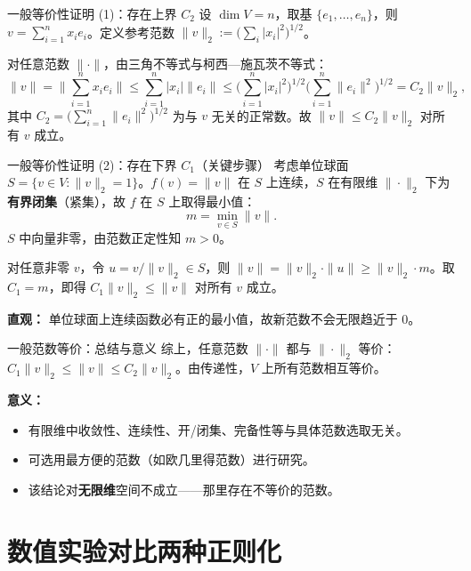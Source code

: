 \documentclass[aspectratio=169]{beamer}
\begin{document}
\begin{frame}{一般等价性证明 (1)：存在上界 $C_2$}
    设 $\dim V = n$，取基 $\{e_1,\dots,e_n\}$，则 $v = \sum_{i=1}^n x_i e_i$。定义参考范数 $\|v\|_2 := \big(\sum_i |x_i|^2\big)^{1/2}$。

    对任意范数 $\|\cdot\|$，由三角不等式与柯西—施瓦茨不等式：
    \[
    \|v\| = \Big\|\sum_{i=1}^n x_i e_i\Big\| \le \sum_{i=1}^n |x_i| \|e_i\|
    \le \Big(\sum_{i=1}^n |x_i|^2\Big)^{\!1/2} \Big(\sum_{i=1}^n \|e_i\|^2\Big)^{\!1/2} = C_2 \|v\|_2,
    \]
    其中 $C_2 = \big(\sum_{i=1}^n \|e_i\|^2\big)^{1/2}$ 为与 $v$ 无关的正常数。故 $\|v\| \le C_2 \|v\|_2$ 对所有 $v$ 成立。
\end{frame}

\begin{frame}{一般等价性证明 (2)：存在下界 $C_1$（关键步骤）}
    考虑单位球面 $S = \{ v \in V : \|v\|_2 = 1 \}$。$f(v)=\|v\|$ 在 $S$ 上连续，$S$ 在有限维 $\|\cdot\|_2$ 下为\textbf{有界闭集}（紧集），故 $f$ 在 $S$ 上取得最小值：
    \[
    m = \min_{v \in S} \|v\|.
    \]
    $S$ 中向量非零，由范数正定性知 $m > 0$。

    对任意非零 $v$，令 $u = v/\|v\|_2 \in S$，则 $\|v\| = \|v\|_2 \cdot \|u\| \ge \|v\|_2 \cdot m$。取 $C_1 = m$，即得 $C_1 \|v\|_2 \le \|v\|$ 对所有 $v$ 成立。

    \vspace{0.2cm}
    \textbf{直观：} 单位球面上连续函数必有正的最小值，故新范数不会无限趋近于 0。
\end{frame}

\begin{frame}{一般范数等价：总结与意义}
    综上，任意范数 $\|\cdot\|$ 都与 $\|\cdot\|_2$ 等价：$C_1 \|v\|_2 \le \|v\| \le C_2 \|v\|_2$。由传递性，$V$ 上所有范数相互等价。

    \vspace{0.3cm}
    \textbf{意义：}
    \begin{itemize}
        \item 有限维中收敛性、连续性、开/闭集、完备性等与具体范数选取无关。
        \item 可选用最方便的范数（如欧几里得范数）进行研究。
        \item 该结论对\textbf{无限维}空间不成立——那里存在不等价的范数。
    \end{itemize}
\end{frame}


\section{数值实验对比两种正则化}
\end{document}
